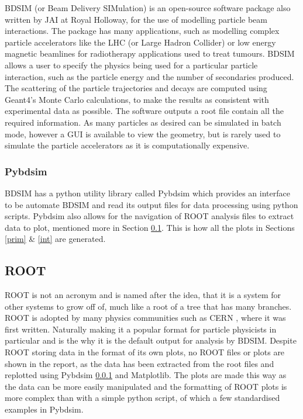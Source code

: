 \documentclass[12pt,a4paper]{article}
\begin{document}
BDSIM (or Beam Delivery SIMulation)
 is an open-source software package also written by JAI at Royal Holloway, for the use of modelling particle beam interactions. The package has many applications, such as modelling complex particle accelerators like the LHC (or Large Hadron Collider) or low energy magnetic beamlines for radiotherapy applications used to treat tumours.
BDSIM allows a user to specify the physics being used for a particular particle interaction, such as the particle energy and the number of secondaries produced. The scattering of the particle trajectories and decays are computed using Geant4's Monte Carlo calculations, to make the results as consistent with experimental data as possible. The software outputs a root file contain all the required information. As many particles as desired can be simulated in batch mode, however a GUI is available to view the geometry, but is rarely used to simulate the particle accelerators as it is computationally expensive.
 
\subsubsection{Pybdsim}
\label{pyb}
BDSIM has a python utility library called Pybdsim which provides an interface to be automate BDSIM and read its output files for data processing using python scripts. Pybdsim also allows for the navigation of ROOT analysis files to extract data to plot, mentioned more in Section \ref{root}. This is how all the plots in Sections \ref{prim} \& \ref{int} are generated.

\subsection{ROOT}\label{root}
ROOT is not an acronym and is named after the idea, that it is a system for other systems to grow off of, much like a root of a tree that has many branches. ROOT is adopted by many physics communities such as CERN \cite{cern}, where it was first written. Naturally making it a popular format for particle physicists in particular and is the why it is the default output for analysis by BDSIM. Despite ROOT storing data in the format of its own plots, no ROOT files or plots are shown in the report, as the data has been extracted from the root files and replotted using Pybdsim \ref{pyb} and Matplotlib. The plots are made this way as the data can be more easily manipulated and the formatting of ROOT plots is more complex than with a simple python script, of which a few standardised examples in Pybdsim.
\end{document}
